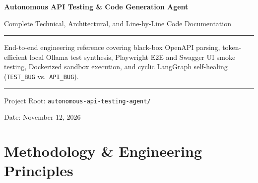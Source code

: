 \documentclass[11pt,a4paper]{article}
\begin{document}
\begin{titlepage}
    \centering
    \vspace*{2.5cm}
    {\Huge\bfseries\color{PrimaryBlue} Autonomous API Testing \& Code Generation Agent\par}
    \vspace{0.75cm}
    {\Large\color{AccentTeal} Complete Technical, Architectural, and Line-by-Line Code Documentation\par}
    \vspace{1.5cm}
    \rule{0.75\textwidth}{0.6pt}\par
    \vspace{1.2cm}
    \begin{minipage}{0.85\textwidth}
        \centering
        \normalsize
        End-to-end engineering reference covering black-box OpenAPI parsing, token-efficient local Ollama test synthesis, Playwright E2E and Swagger UI smoke testing, Dockerized sandbox execution, and cyclic LangGraph self-healing (\texttt{TEST\_BUG} vs.\ \texttt{API\_BUG}).
    \end{minipage}
    \vspace{1.5cm}
    \rule{0.75\textwidth}{0.6pt}\par
    \vfill
    {\large Project Root: \texttt{autonomous-api-testing-agent/}\par}
    \vspace{0.4cm}
    {\normalsize Date: November 12, 2026\par}
\end{titlepage}

\tableofcontents
\newpage

\section{Methodology \& Engineering Principles}
\end{document}

